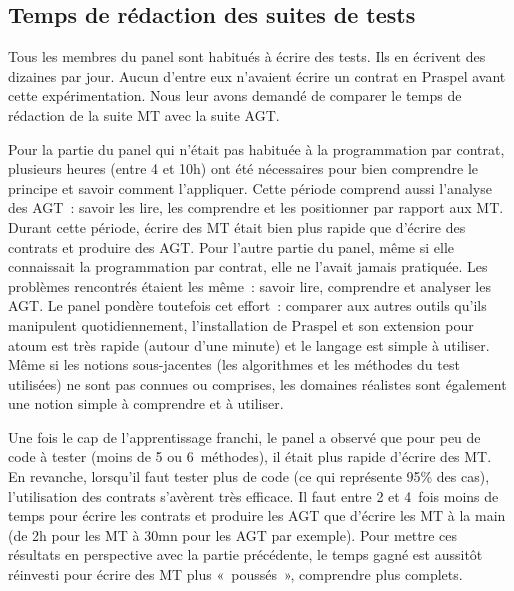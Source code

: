 \subsection{Temps de rédaction des suites de tests}

%

Tous les membres du panel sont habitués à écrire des tests. Ils en écrivent des
dizaines par jour. Aucun d'entre eux n'avaient écrire un contrat en Praspel
avant cette expérimentation. Nous leur avons demandé de comparer le temps de
rédaction de la suite MT avec la suite AGT.

Pour la partie du panel qui n'était pas habituée à la programmation par contrat,
plusieurs heures (entre 4 et 10h) ont été nécessaires pour bien comprendre le
principe et savoir comment l'appliquer. Cette période comprend aussi l'analyse
des AGT~: savoir les lire, les comprendre et les positionner par rapport aux MT.
Durant cette période, écrire des MT était bien plus rapide que d'écrire des
contrats et produire des AGT. Pour l'autre partie du panel, même si elle
connaissait la programmation par contrat, elle ne l'avait jamais pratiquée. Les
problèmes rencontrés étaient les même~: savoir lire, comprendre et analyser les
AGT. Le panel pondère toutefois cet effort~: comparer aux autres outils qu'ils
manipulent quotidiennement, l'installation de Praspel et son extension pour
atoum est très rapide (autour d'une minute) et le langage est simple à utiliser.
Même si les notions sous-jacentes (les algorithmes et les méthodes du test
utilisées) ne sont pas connues ou comprises, les domaines réalistes sont
également une notion simple à comprendre et à utiliser.

Une fois le cap de l'apprentissage franchi, le panel a observé que pour peu de
code à tester (moins de 5 ou 6~méthodes), il était plus rapide d'écrire des MT.
En revanche, lorsqu'il faut tester plus de code (ce qui représente 95\% des
cas), l'utilisation des contrats s'avèrent très efficace. Il faut entre 2 et
4~fois moins de temps pour écrire les contrats et produire les AGT que d'écrire
les MT à la main (de 2h pour les MT à 30mn pour les AGT par exemple). Pour
mettre ces résultats en perspective avec la partie précédente, le temps gagné
est aussitôt réinvesti pour écrire des MT plus «~poussés~», comprendre plus
complets.

